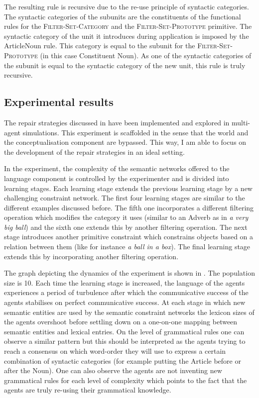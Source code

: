 The resulting rule is recursive due to the re-use principle of
syntactic categories. The syntactic categories of the subunits are
the constituents of the functional rules for the
\textsc{Filter-Set-Category} and the \textsc{Filter-Set-Prototype}
primitive. The syntactic category of the unit it introduces during
application is imposed by the ArticleNoun rule. This category is equal
to the subunit for the \textsc{Filter-Set-Prototype} (in this case
Constituent Noun). As one of the syntactic categories of the subunit
is equal to the syntactic category of the new unit, this rule is truly
recursive.

\subsection{Experimental results}
\label{s:irl-fcg-experimental-results}

The repair strategies discussed in  have been implemented and explored
in multi-agent simulations. This experiment is scaffolded in the sense
that the world and the conceptualisation component are bypassed. This
way, I am able to focus on the development of the repair strategies in
an ideal setting.

In the experiment, the complexity of the semantic networks offered to
the language component is controlled by the experimenter and is
divided into learning stages. Each learning stage extends the previous
learning stage by a new challenging constraint network. The first four
learning stages are similar to the different examples discussed
before. The fifth one incorporates a different filtering operation
which modifies the category it uses (similar to an Adverb as in \textit{a
very big ball}) and the sixth one extends this by another filtering
operation. The next stage introduces another primitive constraint
which constrains objects based on a relation between them (like for
instance \textit{a ball in a box}). The final learning stage extends this
by incorporating another filtering operation.

The graph depicting the dynamics of the experiment is shown in . The population size is
10. Each time the learning stage is increased, the language of the
agents experiences a period of turbulence after which the communicative
success of the agents stabilises on perfect communicative success. At
each stage in which new semantic entities are used by the semantic
constraint networks the lexicon sizes of the agents overshoot before
settling down on a one-on-one mapping between semantic entities and
lexical entries. On the level of grammatical rules one can observe a
similar pattern but this should be interpreted as the agents trying to
reach a consensus on which word-order they will use to express a
certain combination of syntactic categories (for example putting the
Article before or after the Noun). One can also observe the agents are
not inventing new grammatical rules for each level of complexity which
points to the fact that the agents are truly re-using their
grammatical knowledge.

